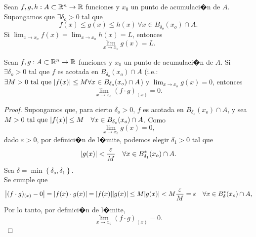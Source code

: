 \documentclass[a4paper]{scrartcl} %
\begin{document}
\begin{propiedad} \label{prop:sandwich} %
Sean $f, g, h : A \subset \mathbb{R}^n \to \mathbb{R}$ funciones y $x_0$ un punto de acumulaci�n de $A$. Supongamos que $\exists \delta_o > 0$ tal que 
\[
 f(x) \le g(x) \le h(x) \, \forall x \in B_{\delta_o}(x_o) \cap A.
\]
Si $\lim_{x \to x_o}f(x) = \lim_{x \to x_o}h(x) = L$, entonces
\[
 \lim_{x \to x_o}g(x) = L.
\]
 
\end{propiedad}

\begin{propiedad} \label{prop:cero_x_acotada}
 Sean $f, g : A \subset \mathbb{R}^n \to \mathbb{R}$ funciones y $x_0$ un punto de acumulaci�n de $A$. Si $\exists \delta_o > 0$ tal que $f$ es acotada en $B_{\delta_o}(x_o) \cap A$ (i.e.: $\exists M > 0 \text{ tal que } \abs{f(x)} \le M \forall x \in  B_{\delta_o}(x_o) \cap A$) y $\lim_{x \to x_o}g(x) = 0$, entonces
\[
 \lim_{x \to x_o}(f \cdot g)_{(x)} = 0.
\]
\begin{proof}
\mbox{}

Supongamos que, para cierto $\delta_o > 0$, $f$ es acotada en $B_{\delta_o}(x_o) \cap A$, y sea $M > 0 \text{ tal que } \abs{f(x)} \le M \quad \forall x \in  B_{\delta_o}(x_o) \cap A$.
Como 
\[
\lim_{x \to x_o}g(x) = 0, 
\]
dado $\varepsilon > 0 $, por definici�n de l�mite, podemos elegir $\delta_1 > 0$ tal que 
\[
 \abs{g(x)} < \frac{\varepsilon}{M} \quad \forall x \in  B^*_{\delta_1}(x_o) \cap A.                                                                                               
\]
Sea $\delta = \min{ \left\{ \delta_o, \delta_1 \right\} }$. \\
Se cumple que
\[
 \abs{ (f \cdot g)_{(x)} - 0 } = \abs{ f(x) \cdot g(x) } = \abs{f(x)}\abs{g(x)} \le 
 M \abs{g(x)} < M \frac{\varepsilon}{M} = \varepsilon \quad \forall x \in  B^*_{\delta}(x_o) \cap A,
\]
Por lo tanto, por definici�n de l�mite,
\[
 \lim_{x \to x_o}(f \cdot g)_{(x)} = 0.
\]

\end{proof}
\end{propiedad}
\end{document}
